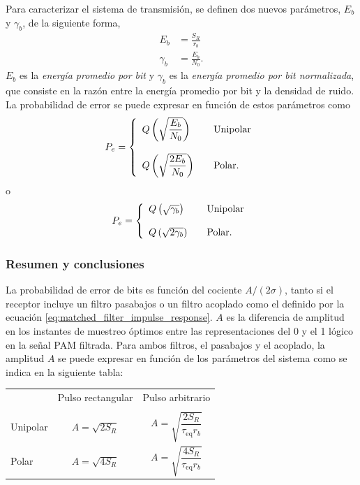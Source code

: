\documentclass[a4paper]{article}
\begin{document}
Para caracterizar el sistema de transmisión, se definen dos nuevos parámetros, \(E_b\) y \(\gamma_b\), de la siguiente forma,
\begin{align*}
 E_b &= \frac{S_R}{r_b}\\
 \gamma_b &= \frac{E_b}{N_0}.
\end{align*}
 \(E_b\) es la \emph{energía promedio por bit} y \(\gamma_b\) es la \emph{energía promedio por bit normalizada}, que consiste en la razón entre la energía promedio por bit y la densidad de ruido. La probabilidad de error se puede expresar en función de estos parámetros como
\begin{equation*}
 P_e=\left\{ 
      \begin{array}{l l l}
    Q\left(\sqrt{\dfrac{E_b}{N_0}}\right) & & \textrm{Unipolar}\\
    \\
    Q\left(\sqrt{\dfrac{2E_b}{N_0}}\right) & & \textrm{Polar.} \end{array} \right.
\end{equation*}
o
\begin{equation*}
 P_e=\left\{ 
      \begin{array}{l l l}
    Q\left(\sqrt{\gamma_b}\right) & & \textrm{Unipolar}\\
    \\
    Q\left(\sqrt{2\gamma_b}\right) & & \textrm{Polar.} \end{array} \right.
\end{equation*}

\subsubsection*{Resumen y conclusiones}

La probabilidad de error de bits es función del cociente \(A/(2\sigma)\), tanto si el receptor incluye un filtro pasabajos o un filtro acoplado como el definido por la ecuación \ref{eq:matched_filter_impulse_response}. \(A\) es la diferencia de amplitud en los instantes de muestreo óptimos entre las representaciones del 0 y el 1 lógico en la señal PAM filtrada.
Para ambos filtros, el pasabajos y el acoplado, la amplitud \(A\) se puede expresar en función de los parámetros del sistema como se indica en la siguiente tabla:
\begin{center}
\begin{tabular}{l c c}
& Pulso rectangular & Pulso arbitrario \\  
\\
Unipolar & \(A=\sqrt{2S_R}\)  &  \(A=\sqrt{\dfrac{2S_R}{\tau_\textrm{eq}r_b}}\) \\
Polar & \(A=\sqrt{4S_R}\)  &  \(A=\sqrt{\dfrac{4S_R}{\tau_\textrm{eq}r_b}}\) \\
\end{tabular}
\end{center}
\end{document}
